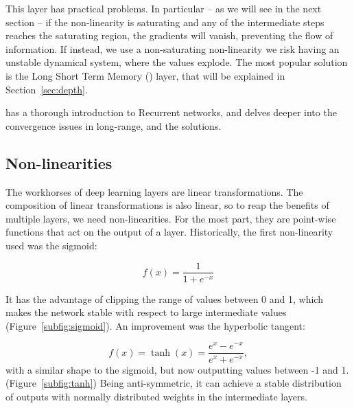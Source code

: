 This layer has practical problems. 
In particular -- as we will see in the next section -- if the non-linearity is saturating and any of the intermediate steps reaches the saturating region, the gradients will vanish, preventing the flow of information.
If instead, we use a non-saturating non-linearity we risk having an unstable dynamical system, where the values explode.
The most popular solution \sidenote{\LSTM} is the Long Short Term Memory (\LSTM) layer, that will be explained in Section~\ref{sec:depth}.


\citet{unreasonable_RNN} has a thorough introduction to Recurrent networks, and \citet{colah_rnn} delves deeper into the convergence issues in long-range, and the solutions.

\subsection{Non-linearities}
The workhorses of deep learning layers are linear transformations.
The composition of linear transformations is also linear, so to reap the benefits of multiple layers, we need non-linearities.
For the most part, they are point-wise functions that act on the output of a layer.
Historically, the first non-linearity used was the sigmoid:

\begin{equation*}
f(x) = \frac{1}{1 + e^{- x}}
\end{equation*}

It has the advantage of clipping the range of values between 0 and 1, which makes the network stable with respect to large intermediate values (Figure~\ref{subfig:sigmoid}).
An improvement was the hyperbolic tangent:

\begin{equation*}
f(x) = \tanh(x) = \frac{e^x - e^{-x}}{e^x + e^{-x}},
\end{equation*}
with a similar shape to the sigmoid, but now outputting values between -1 and 1. (Figure~\ref{subfig:tanh})
Being anti-symmetric, it can achieve a stable distribution of outputs with normally distributed weights in the intermediate layers.

